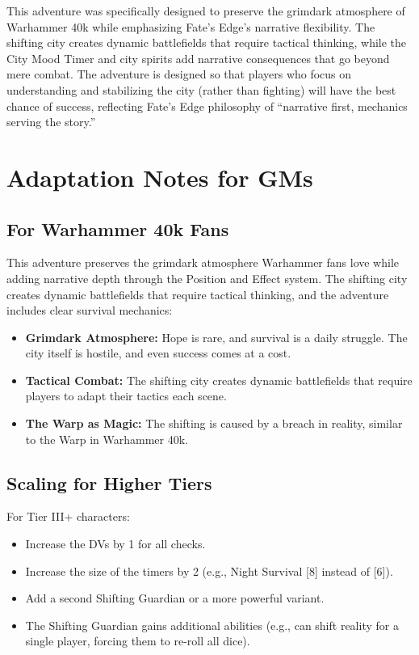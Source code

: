 \documentclass{article}
\begin{document}
\begin{tcolorbox}[colback=blue!5,colframe=blue!50!black,title=Design Note,breakable]
This adventure was specifically designed to preserve the grimdark atmosphere of Warhammer 40k while emphasizing Fate's Edge's narrative flexibility. The shifting city creates dynamic battlefields that require tactical thinking, while the City Mood Timer and city spirits add narrative consequences that go beyond mere combat. The adventure is designed so that players who focus on understanding and stabilizing the city (rather than fighting) will have the best chance of success, reflecting Fate's Edge philosophy of ``narrative first, mechanics serving the story.''
\end{tcolorbox}

\section{Adaptation Notes for GMs}

\subsection{For Warhammer 40k Fans}

This adventure preserves the grimdark atmosphere Warhammer fans love while adding narrative depth through the Position and Effect system. The shifting city creates dynamic battlefields that require tactical thinking, and the adventure includes clear survival mechanics:

\begin{itemize}
    \item \textbf{Grimdark Atmosphere:} Hope is rare, and survival is a daily struggle. The city itself is hostile, and even success comes at a cost.
    \item \textbf{Tactical Combat:} The shifting city creates dynamic battlefields that require players to adapt their tactics each scene.
    \item \textbf{The Warp as Magic:} The shifting is caused by a breach in reality, similar to the Warp in Warhammer 40k.
\end{itemize}

\subsection{Scaling for Higher Tiers}

For Tier III+ characters:

\begin{itemize}
    \item Increase the DVs by 1 for all checks.
    \item Increase the size of the timers by 2 (e.g., Night Survival [8] instead of [6]).
    \item Add a second Shifting Guardian or a more powerful variant.
    \item The Shifting Guardian gains additional abilities (e.g., can shift reality for a single player, forcing them to re-roll all dice).
\end{itemize}
\end{document}
